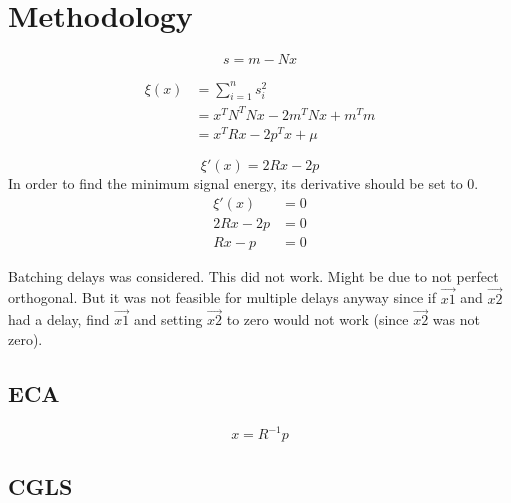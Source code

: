 \chapter{Methodology}

\[s=m-Nx\]
    
\begin{equation}
\begin{split}
    \xi(x) &=  \sum_{i=1}^{n}{s_i^2} \\
&= x^T N^T N x - 2 m^T Nx + m^T m \\
&= x^T R x - 2 p^T x + \mu
\end{split}
\end{equation}


\[\xi'(x) = 2Rx - 2p\]
In order to find the minimum signal energy, its derivative should be set to 0. 
\begin{equation}
\begin{split}
     \xi'(x) &= 0 \\
    2Rx-2p &= 0 \\
    Rx-p &= 0
\end{split}
\end{equation}

Batching delays was considered. This did not work. Might be due to not perfect orthogonal. But it was not feasible for multiple delays anyway since if \(\vec{x1}\) and \(\vec{x2}\) had a delay, find \(\vec{x1}\) and setting \(\vec{x2}\) to zero would not work (since \(\vec{x2}\) was not zero).

\section{ECA}
\begin{equation}
    x = R^{-1}p
\end{equation}

\section{CGLS}